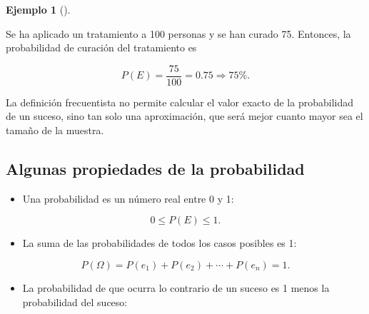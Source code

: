 \documentclass[
  spanish,
  a4paper,
]{scrreport}
\providecommand{\tightlist}{%
  \setlength{\itemsep}{0pt}\setlength{\parskip}{0pt}}
\theoremstyle{definition}
\theoremstyle{definition}
\newtheorem{example}{Ejemplo}[chapter]
\theoremstyle{remark}
\begin{document}
\begin{example}[]\protect\hypertarget{exm-probabilidad-frecuentista}{}\label{exm-probabilidad-frecuentista}

Se ha aplicado un tratamiento a 100 personas y se han curado 75.
Entonces, la probabilidad de curación del tratamiento es

\[P(E) = \frac{75}{100} = 0.75 \Rightarrow 75\%.\]

\end{example}

\begin{tcolorbox}[enhanced jigsaw, arc=.35mm, bottomrule=.15mm, bottomtitle=1mm, breakable, colback=white, colbacktitle=quarto-callout-warning-color!10!white, colframe=quarto-callout-warning-color-frame, coltitle=black, left=2mm, leftrule=.75mm, opacityback=0, opacitybacktitle=0.6, rightrule=.15mm, title=\textcolor{quarto-callout-warning-color}{\faExclamationTriangle}\hspace{0.5em}{Advertencia}, titlerule=0mm, toprule=.15mm, toptitle=1mm]

La definición frecuentista no permite calcular el valor exacto de la
probabilidad de un suceso, sino tan solo una aproximación, que será
mejor cuanto mayor sea el tamaño de la muestra.

\end{tcolorbox}

\subsection{Algunas propiedades de la
probabilidad}\label{algunas-propiedades-de-la-probabilidad}

\begin{itemize}
\tightlist
\item
  Una probabilidad es un número real entre 0 y 1:
\end{itemize}

\[0\leq P(E)\leq 1.\]

\begin{itemize}
\tightlist
\item
  La suma de las probabilidades de todos los casos posibles es 1:
\end{itemize}

\[P(\Omega) = P(e_1) + P(e_2) + \cdots + P(e_n) = 1.\]

\begin{itemize}
\tightlist
\item
  La probabilidad de que ocurra lo contrario de un suceso es 1 menos la
  probabilidad del suceso:
\end{itemize}
\end{document}
